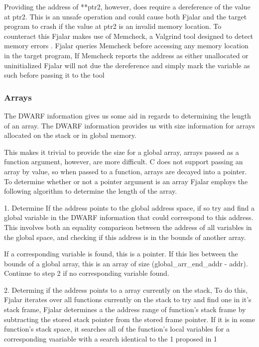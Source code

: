 \documentclass[11pt]{article}
\begin{document}
Providing the address of **ptr2, however, does require a dereference
of the value at ptr2. This is an unsafe operation and could cause both
Fjalar and the target program to crash if the value at ptr2 is an
invalid memory location. To counteract this Fjalar makes use of
Memcheck, a Valgrind tool designed to detect memory errors \cite{nethercote-shadow}. Fjalar queries
Memcheck before accessing any memory location in the target
program, If Memcheck reports the address as either unallocated or
uninitialized Fjalar will not due the dereference and simply mark the
variable as such before passing it to the tool

\subsubsection{Arrays}
The DWARF information gives us some aid in regards to determining the
length of an array. The DWARF information provides us with
size information for arrays allocated on the stack or in global
memory.

This makes it trivial to provide the size for a global array, arrays
passed as a function argument, however, are more difficult. C does not
support passing an array by value, so when passed to a function,
arrays are decayed into a pointer. To determine whether or not a
pointer argument is an array Fjalar employs the following algorithm to
determine the length of the array.

1. Determine If the address points to the global address space, if so
   try and find a global variable in the DWARF information that could
   correspond to this address. This involves both an equality comparison
   between the address of all variables in the global space, and checking
   if this address is in the bounds of another array.
   
   If a corresponding variable is found, this is a pointer. If this lies
   between the bounds of a global array, this is an array of size
   (global\_arr\_end\_addr - addr). Continue to step 2 if no
   corresponding variable found.

2. Determing if the address points to a array currently on the stack,
   To do this, Fjalar iterates over all functions currently on the
   stack to try and find one in it's stack frame, Fjalar determines a
   the address range of function's stack frame by subtracting the
   stored stack pointer from the stored frame pointer. If it is in
   some function's stack space, it searches all of the function's
   local variables for a corresponding vaariable with a search
   identical to the 1 proposed in 1
\end{document}
